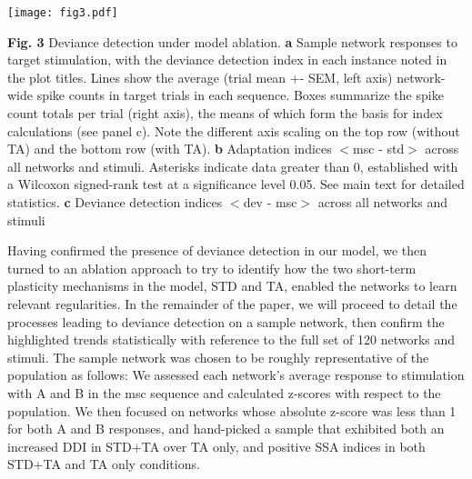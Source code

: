\documentclass[pdflatex,referee,iicol,sn-basic]{sn-jnl}
\theoremstyle{thmstyleone}%
\theoremstyle{thmstyletwo}%
\theoremstyle{thmstylethree}%
\begin{document}

\begin{figure*}%
    \centering
    \texttt{[image: fig3.pdf]}
    \caption{}
    \label{fig3}
\end{figure*}
\textbf{Fig. 3} Deviance detection under model ablation. \textbf{a} Sample network responses to target stimulation, with the deviance detection index in each instance noted in the plot titles. Lines show the average (trial mean +- SEM, left axis) network-wide spike counts in target trials in each sequence. Boxes summarize the spike count totals per trial (right axis), the means of which form the basis for index calculations (see panel c). Note the different axis scaling on the top row (without TA) and the bottom row (with TA). \textbf{b} Adaptation indices $<$msc - std$>$ across all networks and stimuli. Asterisks indicate data greater than 0, established with a Wilcoxon signed-rank test at a significance level 0.05. See main text for detailed statistics. \textbf{c} Deviance detection indices $<$dev - msc$>$ across all networks and stimuli

Having confirmed the presence of deviance detection in our model, we then turned to an ablation approach to try to identify how the two short-term plasticity mechanisms in the model, STD and TA, enabled the networks to learn relevant regularities. In the remainder of the paper, we will proceed to detail the processes leading to deviance detection on a sample network, then confirm the highlighted trends statistically with reference to the full set of 120 networks and stimuli. The sample network was chosen to be roughly representative of the population as follows: We assessed each network's average response to stimulation with A and B in the msc sequence and calculated z-scores with respect to the population. We then focused on networks whose absolute z-score was less than 1 for both A and B responses, and hand-picked a sample that exhibited both an increased DDI in STD+TA over TA only, and positive SSA indices in both STD+TA and TA only conditions.
\end{document}
